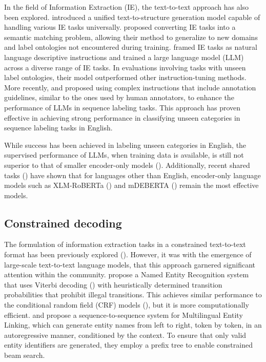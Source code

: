 In the field of Information Extraction (IE), the text-to-text approach has also been explored. \cite{DBLP:conf/acl/0001LDXLHSW22} introduced a unified text-to-structure generation model capable of handling various IE tasks universally. \cite{DBLP:conf/aaai/Lou0DJLH0023} proposed converting IE tasks into a semantic matching problem, allowing their method to generalize to new domains and label ontologies not encountered during training. \cite{DBLP:journals/corr/abs-2304-08085} framed IE tasks as natural language descriptive instructions and trained a large language model (LLM) across a diverse range of IE tasks. In evaluations involving tasks with unseen label ontologies, their model outperformed other instruction-tuning methods. More recently, \cite{DBLP:conf/acl/BlevinsGZ23} and \cite{sainz2024gollie} proposed using complex instructions that include annotation guidelines, similar to the ones used by human annotators, to enhance the performance of LLMs in sequence labeling tasks. This approach has proven effective in achieving strong performance in classifying unseen categories in sequence labeling tasks in English.

While success has been achieved in labeling unseen categories in English, the supervised performance of LLMs, when training data is available, is still not superior to that of smaller encoder-only models (\cite{sainz2024gollie}). Additionally, recent shared tasks (\citep{DBLP:conf/semeval/FetahuKCRM23}) have shown that for languages other than English, encoder-only language models such as XLM-RoBERTa (\cite{conneau-etal-2020-unsupervised}) and mDEBERTA (\cite{DBLP:conf/iclr/HeLGC21/deberta}) remain the most effective models.




\subsection{Constrained decoding}

The formulation of information extraction tasks in a constrained text-to-text format has been previously explored (\cite{DBLP:conf/nips/VinyalsKKPSH15,DBLP:conf/acl/XiaoDG16,DBLP:conf/naacl/DyerKBS16}). However, it was with the emergence of large-scale text-to-text language models, that this approach garnered significant attention within the community. \citet{DBLP:conf/emnlp/LesterPHCB20} propose a Named Entity Recognition system that uses Viterbi decoding (\cite{viterbi}) with heuristically determined transition probabilities that prohibit illegal transitions. This achieves similar performance to the conditional random field (CRF) models (\cite{DBLP:conf/icml/LaffertyMP01}), but it is more computationally efficient. \citet{genre} and \citet{mgenre} propose a sequence-to-sequence system for Multilingual Entity Linking, which can generate entity names from left to right, token by token, in an autoregressive manner, conditioned by the context. To ensure that only valid entity identifiers are generated, they employ a prefix tree to enable constrained beam search. 

